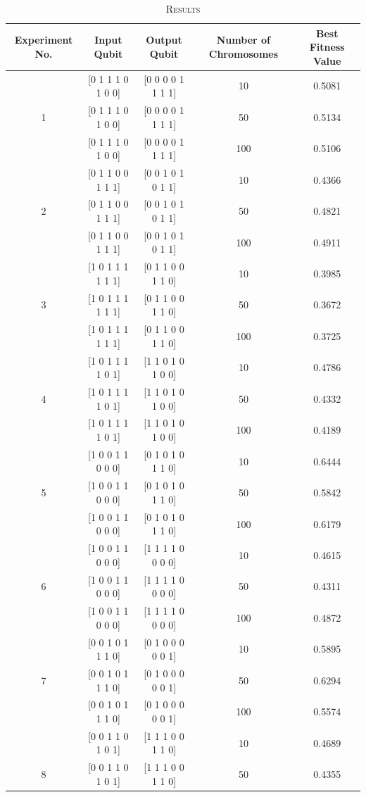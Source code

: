 \documentclass[conference]{IEEEtran}
\begin{document}
\begin{table}[!t]
\caption{\textsc{Results}}
\label{tab:3}
\centering
{
\begin{tabular}{| c | c | c | c | c |}
\hline
Experiment No. & Input Qubit & Output Qubit & Number of Chromosomes &  Best Fitness Value \\
\hline
 & [0 1 1 1 0 1 0 0] & [0 0 0 0 1 1 1 1] & 10 & 0.5081 \\
1 & [0 1 1 1 0 1 0 0] & [0 0 0 0 1 1 1 1] & 50 & 0.5134 \\
 & [0 1 1 1 0 1 0 0] & [0 0 0 0 1 1 1 1] & 100 & 0.5106 \\
\hline
 & [0 1 1 0 0 1 1 1] & [0 0 1 0 1 0 1 1] & 10 & 0.4366 \\
2 & [0 1 1 0 0 1 1 1] & [0 0 1 0 1 0 1 1] & 50 & 0.4821 \\
 & [0 1 1 0 0 1 1 1] & [0 0 1 0 1 0 1 1] & 100 & 0.4911 \\
\hline
 & [1 0 1 1 1 1 1 1] & [0 1 1 0 0 1 1 0] & 10 & 0.3985 \\
3 & [1 0 1 1 1 1 1 1] & [0 1 1 0 0 1 1 0] & 50 & 0.3672 \\
 & [1 0 1 1 1 1 1 1] & [0 1 1 0 0 1 1 0] & 100 & 0.3725 \\
\hline
 & [1 0 1 1 1 1 0 1] & [1 1 0 1 0 1 0 0] & 10 & 0.4786 \\
4 & [1 0 1 1 1 1 0 1] & [1 1 0 1 0 1 0 0] & 50 & 0.4332 \\
 & [1 0 1 1 1 1 0 1] & [1 1 0 1 0 1 0 0] & 100 & 0.4189 \\
\hline
 & [1 0 0 1 1 0 0 0] & [0 1 0 1 0 1 1 0] & 10 & 0.6444 \\
5 & [1 0 0 1 1 0 0 0] & [0 1 0 1 0 1 1 0] & 50 & 0.5842 \\
 & [1 0 0 1 1 0 0 0] & [0 1 0 1 0 1 1 0] & 100 & 0.6179 \\
\hline
 & [1 0 0 1 1 0 0 0] & [1 1 1 1 0 0 0 0] & 10 & 0.4615 \\
6 & [1 0 0 1 1 0 0 0] & [1 1 1 1 0 0 0 0] & 50 & 0.4311 \\
 & [1 0 0 1 1 0 0 0] & [1 1 1 1 0 0 0 0] & 100 & 0.4872 \\
\hline
 & [0 0 1 0 1 1 1 0] & [0 1 0 0 0 0 0 1] & 10 & 0.5895 \\
7 & [0 0 1 0 1 1 1 0] & [0 1 0 0 0 0 0 1] & 50 & 0.6294 \\
 & [0 0 1 0 1 1 1 0] & [0 1 0 0 0 0 0 1] & 100 & 0.5574 \\
\hline
 & [0 0 1 1 0 1 0 1] & [1 1 1 0 0 1 1 0] & 10 & 0.4689 \\
8 & [0 0 1 1 0 1 0 1] & [1 1 1 0 0 1 1 0] & 50 & 0.4355 \\

\end{tabular}}
\end{table}
\end{document}
